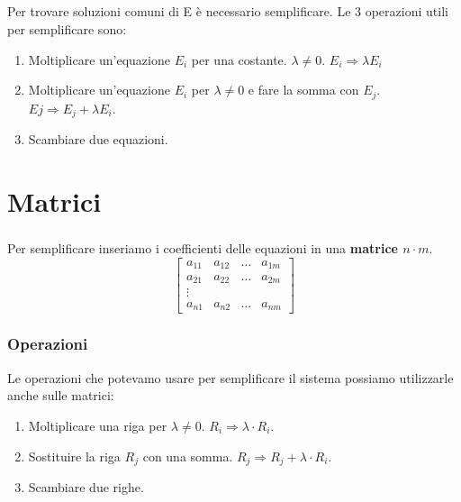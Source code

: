 \documentclass[a4paper, 12pt]{report}
\begin{document}
                    \paragraph{}Per trovare soluzioni comuni di E è necessario semplificare.
                    Le 3 operazioni utili per semplificare sono:
                            \begin{enumerate}[label=\Alph*)]
                                \item Moltiplicare un'equazione $E_i$ per una costante. $\lambda \neq 0$. $E_i\Rightarrow\lambda E_i$ 
                                \item Moltiplicare un'equazione $E_i$ per $\lambda \neq 0$ e fare la somma con $E_j$.\\ $Ej\Rightarrow E_j+\lambda E_i$. 
                                \item Scambiare due equazioni.
                            \end{enumerate}
    \chapter{Matrici}
            \paragraph{}Per semplificare inseriamo i coefficienti delle equazioni in una \textbf{matrice $n\cdot m$}.
            $$
            \begin{bmatrix}
                a_{11} & a_{12} & \dots & a_{1m}\\
                a_{21} & a_{22} & \dots & a_{2m}\\
                \vdots\\
                a_{n1} & a_{n2} & \dots & a_{nm}
            \end{bmatrix}
            $$
            \subsection{Operazioni}
                Le operazioni che potevamo usare per semplificare il sistema possiamo utilizzarle anche sulle matrici:
                    \begin{enumerate}[label=\Alph*)]
                        \item Moltiplicare una riga per $\lambda \neq 0$. $R_i \Rightarrow \lambda \cdot R_i$.
                        \item Sostituire la riga $R_j$ con una somma. $R_j \Rightarrow R_j + \lambda \cdot R_i$.
                        \item Scambiare due righe.
                    \end{enumerate}
\end{document}
